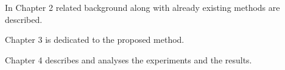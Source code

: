 In Chapter 2 related background along with already existing methods are described.

Chapter 3 is dedicated to the proposed method.

Chapter 4 describes and analyses the experiments and the results.

















    



